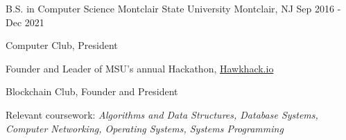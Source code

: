 

\begin{cventries}

  \cventry
    {B.S. in Computer Science} %
    {Montclair State University} %
    {Montclair, NJ} %
    {Sep 2016 - Dec 2021} %
    {
        \begin{cvitems} %
            \item Computer Club, President
            \item Founder and Leader of MSU's annual Hackathon, \href{www.hawkhack.io}{Hawkhack.io}
            \item Blockchain Club, Founder and President
            \item Relevant coursework: {\textit{Algorithms and Data Structures, Database Systems, Computer Networking, Operating Systems, Systems Programming}}
      \end{cvitems}
    }
\vspace{-0.4cm}
\end{cventries}
